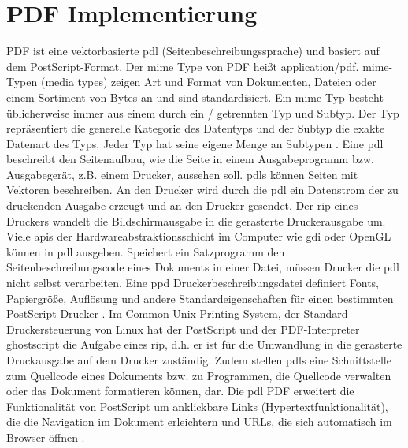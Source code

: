 \section{PDF Implementierung}
PDF ist eine vektorbasierte \gls{pdl} (Seitenbeschreibungssprache) und basiert auf dem PostScript-Format. Der \gls{mime} Type von PDF heißt application/pdf. \gls{mime}-Typen (media types) zeigen Art und Format von Dokumenten, Dateien oder einem Sortiment von Bytes an und sind standardisiert. Ein \gls{mime}-Typ besteht üblicherweise immer aus einem durch ein / getrennten Typ und Subtyp. Der Typ repräsentiert die generelle Kategorie des Datentyps und der Subtyp die exakte Datenart des Typs. Jeder Typ hat seine eigene Menge an Subtypen \cite{mime}. Eine \gls{pdl} beschreibt den Seitenaufbau, wie die Seite in einem Ausgabeprogramm bzw. Ausgabegerät, z.B. einem Drucker, aussehen soll. \gls{pdl}s können Seiten mit Vektoren beschreiben. An den Drucker wird durch die \gls{pdl} ein Datenstrom der zu druckenden Ausgabe erzeugt und an den Drucker gesendet. Der \gls{rip} eines Druckers wandelt die Bildschirmausgabe in die gerasterte Druckerausgabe um. Viele \gls{api}s der Hardwareabstraktionsschicht im Computer wie \gls{gdi} oder OpenGL können in \gls{pdl} ausgeben. Speichert ein Satzprogramm den Seitenbeschreibungscode eines Dokuments in einer Datei, müssen Drucker die \gls{pdl} nicht selbst verarbeiten. Eine \gls{ppd} Druckerbeschreibungsdatei definiert Fonts, Papiergröße, Auflösung und andere Standardeigenschaften für einen bestimmten PostScript-Drucker \cite{ppd-file}. Im Common Unix Printing System, der Standard-Druckersteuerung von Linux hat der PostScript und der PDF-Interpreter ghostscript die Aufgabe eines \gls{rip}, d.h. er ist für die Umwandlung in die gerasterte Druckausgabe auf dem Drucker zuständig. Zudem stellen \gls{pdl}s eine Schnittstelle zum Quellcode eines Dokuments bzw. zu Programmen, die Quellcode verwalten oder das Dokument formatieren können, dar. Die \gls{pdl} PDF erweitert die Funktionalität von PostScript um anklickbare Links (Hypertextfunktionalität), die die Navigation im Dokument erleichtern und URLs, die sich automatisch im Browser öffnen \cite{wiki-pdl}.

